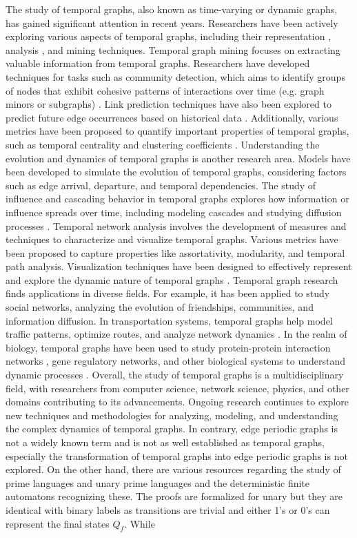 The study of temporal graphs, also known as time-varying or dynamic graphs, has gained significant attention in recent years. Researchers have been actively exploring various aspects of temporal graphs, including their representation \cite{Holme_2012}, analysis \cite{DBLP:journals/corr/Erlebach0K15}\cite{DBLP:journals/corr/Michail15}, and mining techniques. Temporal graph mining focuses on extracting valuable information from temporal graphs. Researchers have developed techniques for tasks such as community detection, which aims to identify groups of nodes that exhibit cohesive patterns of interactions over time (e.g. graph minors or subgraphs) \cite{arrighi2022multiparameter}. Link prediction techniques have also been explored to predict future edge occurrences based on historical data \cite{temporalLinkPrediction}. Additionally, various metrics have been proposed to quantify important properties of temporal graphs, such as temporal centrality and clustering coefficients \cite{temporalClusterCoefficient}. Understanding the evolution and dynamics of temporal graphs is another research area. Models have been developed to simulate the evolution of temporal graphs, considering factors such as edge arrival, departure, and temporal dependencies. The study of influence and cascading behavior in temporal graphs explores how information or influence spreads over time, including modeling cascades and studying diffusion processes \cite{temporalEvolution}. Temporal network analysis involves the development of measures and techniques to characterize and visualize temporal graphs. Various metrics have been proposed to capture properties like assortativity, modularity, and temporal path analysis. Visualization techniques have been designed to effectively represent and explore the dynamic nature of temporal graphs \cite{kerracher2014design}. Temporal graph research finds applications in diverse fields. For example, it has been applied to study social networks, analyzing the evolution of friendships, communities, and information diffusion. In transportation systems, temporal graphs help model traffic patterns, optimize routes, and analyze network dynamics \cite{tang2009temporal}. In the realm of biology, temporal graphs have been used to study protein-protein interaction networks \cite{fu2022dppin}, gene regulatory networks, and other biological systems to understand dynamic processes \cite{dibrita2022temporal}. Overall, the study of temporal graphs is a multidisciplinary field, with researchers from computer science, network science, physics, and other domains contributing to its advancements. Ongoing research continues to explore new techniques and methodologies for analyzing, modeling, and understanding the complex dynamics of temporal graphs. In contrary, edge periodic graphs is not a widely known term and is not as well established as temporal graphs, especially the transformation of temporal graphs into edge periodic graphs is not explored. On the other hand, there are various resources regarding the study of prime languages and unary prime languages and the deterministic finite automatons recognizing these. The proofs are formalized for unary \DFAs but they are identical with binary labels as transitions are trivial and either 1's or 0's can represent the final states $Q_f$. While 